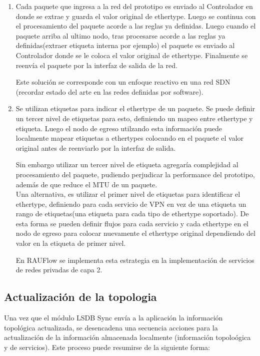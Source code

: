 \begin{enumerate}
\item Cada paquete que ingresa a la red del prototipo es enviado al Controlador en donde se extrae y guarda el valor original de ethertype. Luego se continua con el procesamiento del paquete acorde a las reglas ya definidas. Luego cuando el paquete arriba al ultimo nodo, tras procesarse acorde a las reglas ya definidas(extraer etiqueta interna por ejemplo) el paquete es enviado al Controlador donde se le coloca el valor original de ethertype. Finalmente se reenv\'ia el paquete por la interfaz de salida de la red.

Este soluci\'on se corresponde con un enfoque reactivo en una red SDN (recordar estado del arte en las redes definidas por software).

\item Se utilizan etiquetas para indicar el ethertype de un paquete. Se puede definir un tercer nivel de etiquetas para esto, definiendo un mapeo entre ethertype y etiqueta. Luego el nodo de egreso utilzando esta informaci\'on puede localmente mapear etiquetas a ethertypes colocando en el paquete el valor original antes de reenviarlo por la interfaz de salida. 

Sin embargo utilizar un tercer nivel de etiqueta agregar\'ia complejidad al procesamiento del paquete, pudiendo perjudicar la performance del prototipo, adem\'as de que reduce el MTU de un paquete.\\ 

Una alternativa, es utilizar el primer nivel de etiquetas para identificar el ethertype, definiendo para cada servicio de VPN en vez de una etiqueta un rango de etiquetas(una etiqueta para cada tipo de ethertype soportado). De esta forma se pueden definir flujos para cada servicio y cada ethertype en el nodo de egreso para colocar nuevamente el ethertype original dependiendo del valor en la etiqueta de primer nivel.

En RAUFlow se implementa esta estrategia en la implementaci\'on de servicios de redes privadas de capa 2. 

\end{enumerate} 

\subsection{Actualizaci\'on de la topologia}
Una vez que el m\'odulo LSDB Sync envía a la aplicaci\'on la informaci\'on topol\'ogica actualizada, se desencadena una secuencia acciones para la actualizaci\'on de la informaci\'on almacenada localmente (informaci\'on topolo\'ogica y de servicios). Este proceso puede resumirse de la siguiente forma:

